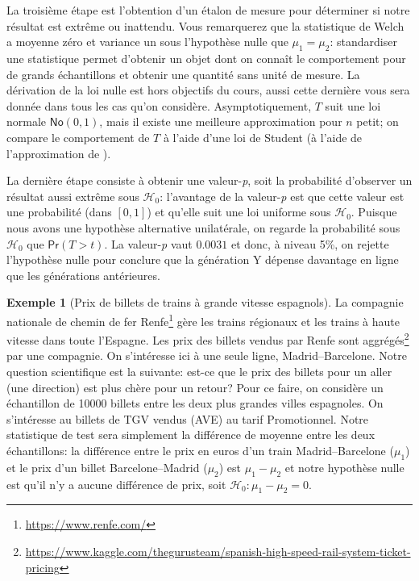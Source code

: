\documentclass[
  11pt,
  letterpaper,
]{article}
\renewcommand{\href}[2]{#2\footnote{\url{#1}}}
\theoremstyle{definition}
\theoremstyle{definition}
\newtheorem{example}{Exemple}[section]
\theoremstyle{definition}
\theoremstyle{definition}
\theoremstyle{remark}
\begin{document}
La troisième étape est l'obtention d'un étalon de mesure pour déterminer si notre résultat est extrême ou inattendu. Vous remarquerez que la statistique de Welch a moyenne zéro et variance un sous l'hypothèse nulle que \(\mu_1=\mu_2\): standardiser une statistique permet d'obtenir un objet dont on connaît le comportement pour de grands échantillons et obtenir une quantité sans unité de mesure. La dérivation de la loi nulle est hors objectifs du cours, aussi cette dernière vous sera donnée dans tous les cas qu'on considère. Asymptotiquement, \(T\) suit une loi normale \(\mathsf{No}(0, 1)\), mais il existe une meilleure approximation pour \(n\) petit; on compare le comportement de \(T\) à l'aide d'une loi de Student (à l'aide de l'approximation de \citet{Satterthwaite1946}).

La dernière étape consiste à obtenir une valeur-\emph{p}, soit la probabilité d'observer un résultat aussi extrême sous \(\mathscr{H}_0\): l'avantage de la valeur-\emph{p} est que cette valeur est une probabilité (dans \([0, 1]\)) et qu'elle suit une loi uniforme sous \(\mathscr{H}_0\). Puisque nous avons une hypothèse alternative unilatérale, on regarde la probabilité sous \(\mathscr{H}_0\) que \(\mathsf{Pr}(T > t)\). La valeur-\emph{p} vaut \(0.0031\) et donc, à niveau 5\%, on rejette l'hypothèse nulle pour conclure que la génération Y dépense davantage en ligne que les générations antérieures.

\begin{example}[Prix de billets de trains à grande vitesse espagnols]
\protect\hypertarget{exm:prix-trains-tests}{}\label{exm:prix-trains-tests}La compagnie nationale de chemin de fer \href{https://www.renfe.com/}{Renfe} gère les trains régionaux et les trains à haute vitesse dans toute l'Espagne. Les prix des billets vendus par Renfe sont \href{https://www.kaggle.com/thegurusteam/spanish-high-speed-rail-system-ticket-pricing}{aggrégés} par une compagnie. On s'intéresse ici à une seule ligne, Madrid--Barcelone. Notre question scientifique est la suivante: est-ce que le prix des billets pour un aller (une direction) est plus chère pour un retour? Pour ce faire, on considère un échantillon de 10000 billets entre les deux plus grandes villes espagnoles. On s'intéresse au billets de TGV vendus (AVE) au tarif Promotionnel. Notre statistique de test sera simplement la différence de moyenne entre les deux échantillons: la différence entre le prix en euros d'un train Madrid--Barcelone (\(\mu_1\)) et le prix d'un billet Barcelone--Madrid (\(\mu_2\)) est \(\mu_1-\mu_2\) et notre hypothèse nulle est qu'il n'y a aucune différence de prix, soit \(\mathscr{H}_0: \mu_1-\mu_2=0\).
\end{example}
\end{document}
